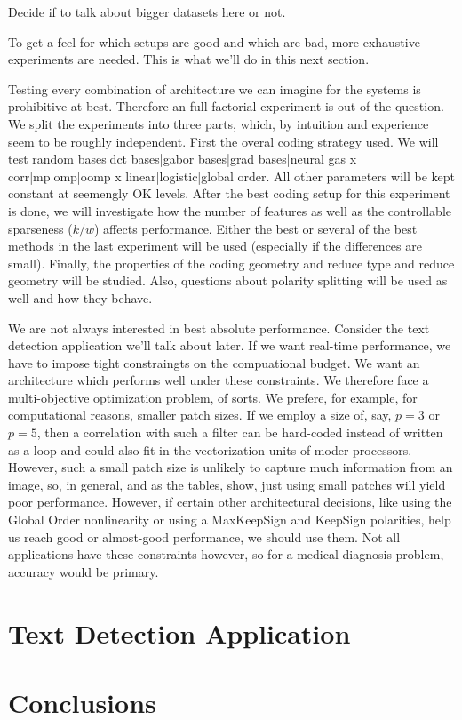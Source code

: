 \documentclass[12pt,a4paper,oneside,english]{UPBThesis}
\begin{document}
Decide if to talk about bigger datasets here or not.

To get a feel for which setups are good and which are bad, more exhaustive experiments are needed. This is what we'll do in this next section.

Testing every combination of architecture we can imagine for the systems is prohibitive at best. Therefore an full factorial experiment is out of the question. We split the experiments into three parts, which, by intuition and experience seem to be roughly independent. First the overal coding strategy used. We will test {random bases|dct bases|gabor bases|grad bases|neural gas} x {corr|mp|omp|oomp} x {linear|logistic|global order}. All other parameters will be kept constant at seemengly OK levels. After the best coding setup for this experiment is done, we will investigate how the number of features as well as the controllable sparseness ($k/w$) affects performance. Either the best or several of the best methods in the last experiment will be used (especially if the differences are small). Finally, the properties of the coding geometry and reduce type and reduce geometry will be studied. Also, questions about polarity splitting will be used as well and how they behave.

We are not always interested in best absolute performance. Consider the text detection application we'll talk about later. If we want real-time performance, we have to impose tight constraingts on the compuational budget. We want an architecture which performs well under these constraints. We therefore face a multi-objective optimization problem, of sorts. We prefere, for example, for computational reasons, smaller patch sizes. If we employ a size of, say, $p=3$ or $p=5$, then a correlation with such a filter can be hard-coded instead of written as a loop and could also fit in the vectorization units of moder processors. However, such a small patch size is unlikely to capture much information from an image, so, in general, and as the tables, show, just using small patches will yield poor performance. However, if certain other architectural decisions, like using the Global Order nonlinearity or using a MaxKeepSign and KeepSign polarities, help us reach good or almost-good performance, we should use them. Not all applications have these constraints however, so for a medical diagnosis problem, accuracy would be primary.

\chapter{Text Detection Application}

\chapter{Conclusions}




\appendix
\end{document}
